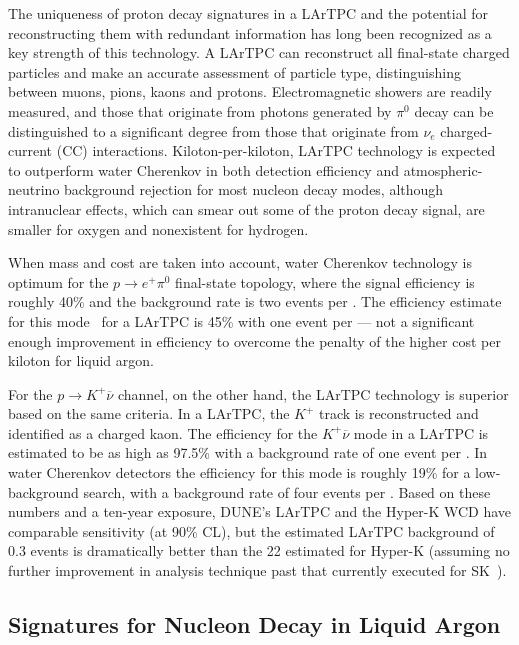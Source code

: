 The uniqueness of proton decay signatures in a
LArTPC and the potential for reconstructing them with redundant
information has long been recognized as a key strength of this
technology. A LArTPC can reconstruct all final-state charged
particles and make an accurate assessment of particle type,
distinguishing between muons, pions, kaons and
protons. Electromagnetic showers are readily measured, and those that
originate from photons generated by $\pi^0$ decay can be distinguished
to a significant degree from those that originate from $\nu_e$ charged-current (CC)
 interactions.  Kiloton-per-kiloton, LArTPC technology
is expected to outperform water Cherenkov in both detection efficiency
and atmospheric-neutrino background rejection for most nucleon decay
modes, although intranuclear effects, which can smear out some of the
proton decay signal, are smaller for oxygen and nonexistent for
hydrogen.

When mass and cost are taken into account, water Cherenkov technology
is optimum for the $p\to e^+\pi^0$ final-state topology, where the
signal efficiency is roughly 40\% and the background rate is two events
per \SI{}{\Mtyr}.
The efficiency estimate
for this mode~\cite{Bueno:2007um} for a 
LArTPC is 45\% with one event per  \SI{}{\Mtyr} --- not a significant
enough improvement in efficiency to overcome the penalty of the higher
cost per kiloton for liquid argon.

For the $p \rightarrow K^+ \overline{\nu}$ channel, on the other hand, the
LArTPC technology is superior based on the same criteria.  In a
LArTPC, the $K^+$ track is reconstructed and identified as a charged
kaon. The efficiency for the $K^+ \overline{\nu}$ mode in a LArTPC is estimated
to be as high as 97.5\% with a background rate of one event per 
 \SI{}{\Mtyr}. In water Cherenkov detectors the efficiency for this mode is roughly
19\% for a low-background search, with a background rate of four events
per  \SI{}{\Mtyr}.
Based on these numbers and a ten-year exposure, DUNE's 
 LArTPC and the  Hyper-K WCD have comparable
sensitivity (at 90\% CL), but the estimated LArTPC background of 0.3
events is dramatically better than the 22 estimated for Hyper-K 
(assuming no further improvement in analysis technique past that
currently executed for SK~\cite{kearns_isoups}).
 
\subsection{Signatures for Nucleon Decay in Liquid Argon}

